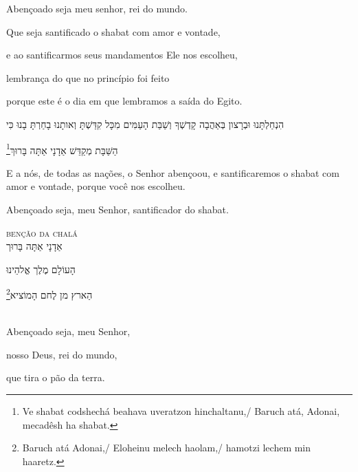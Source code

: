 Abençoado seja meu senhor, rei do mundo.

Que seja santificado o shabat com amor e vontade, 

e ao santificarmos seus mandamentos Ele nos escolheu,

lembrança do que no princípio foi feito

porque este é o dia em que lembramos a saída do \qb{}Egito.\\[10pt]


\movetoevenpage
\raggedleft

\vspace*{1cm}


הִנְחַלְתָּנוּ וּבְרָצון בְּאַהֲבָה קָדְשְׁךָ וְשַׁבַּת הָעַמִּים מִכָּל קִדַּשְׁתָּ וְאותָנוּ בָחַרְתָּ בָנוּ כִּי

הַשַּׁבָּת מְקַדֵּשׁ אַדָנָי אַתָּה בָּרוּךְ\footnote{Ve shabat codshechá beahava uveratzon hinchaltanu,/
Baruch atá, Adonai, mecadêsh ha shabat.}

\movetooddpage
\raggedright

\vspace*{1cm}

E a nós, de todas as nações, o Senhor abençoou, e santificaremos o shabat com amor e vontade, porque 
você nos escolheu. 

Abençoado seja, meu Senhor, santificador do shabat.

\movetoevenpage
\raggedleft


\vspace*{1cm}

\textsc{benção da chalá}\\[15pt]

אַדָנָי אַתָּה בָּרוּך

הָעוֹלָם מֶלֶך אֱלהֵינוּ 

הַארץ מן לֶחם הָמוֹציא\footnote{Baruch atá Adonai,/ Eloheinu melech haolam,/ hamotzi lechem min haaretz.}

\movetooddpage
\raggedright

\vspace*{1cm}

\textsc{}\\[15pt]

Abençoado seja, meu Senhor,

nosso Deus, rei do mundo,

que tira o pão da terra.

